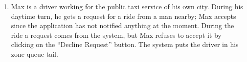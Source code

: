 \begin{enumerate}
\item Max is a driver working for the public taxi service of his own city. During his daytime turn, he gets a request for a ride from a man nearby; Max accepts since the application has not notified anything at the moment. During the ride a request comes from the system, but Max refuses to accept it by clicking on the “Decline Request” button. The system puts the driver in his zone queue tail. 

\end{enumerate}
\subsection{}
\subsection{}
